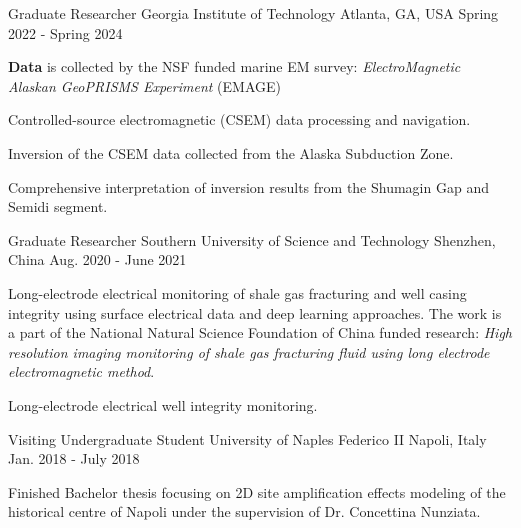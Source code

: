 

\begin{cventries}

  \cventry
    {Graduate Researcher} %
    {Georgia Institute of Technology} %
    {Atlanta, GA, USA} %
    {Spring 2022 - Spring 2024} %
    {
      \begin{cvitems}
        \item {\textbf{Data} is collected by the NSF funded marine EM survey: \textit{ElectroMagnetic Alaskan GeoPRISMS Experiment} (EMAGE)}
        \item {Controlled-source electromagnetic (CSEM) data processing and navigation.}
        \item {Inversion of the CSEM data collected from the Alaska Subduction Zone.}
        \item {Comprehensive interpretation of inversion results from the Shumagin Gap and Semidi segment.}
      \end{cvitems}
    }

  \cventry
    {Graduate Researcher} %
    {Southern University of Science and Technology} %
    {Shenzhen, China} %
    {Aug. 2020 - June 2021} %
    {
      \begin{cvitems} %
        \item {Long-electrode electrical monitoring of shale gas fracturing and well casing integrity using surface electrical data and deep learning approaches. The work is a part of the National Natural Science Foundation of China funded research: \textit{High resolution imaging monitoring of shale gas fracturing fluid using long electrode electromagnetic method}.}
        \item {Long-electrode electrical well integrity monitoring.}
      \end{cvitems}
    }

  \cventry
    {Visiting Undergraduate Student} %
    {University of Naples Federico II} %
    {Napoli, Italy} %
    {Jan. 2018 - July 2018} %
    {
      \begin{cvitems} %
        \item {Finished Bachelor thesis focusing on 2D site amplification effects modeling of the historical centre of Napoli under the supervision of Dr. Concettina Nunziata.}
      \end{cvitems}
    }

\end{cventries}
